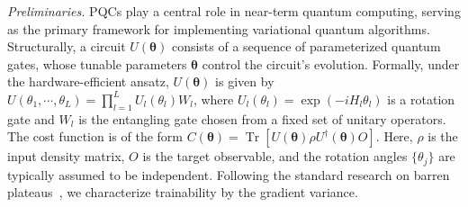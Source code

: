 \documentclass[%
 superscriptaddress,
 aps,prl,
 reprint,
 twocolumn,
 amsmath,amssymb,showpacs,
 bibnotes,
]{revtex4-2}
\begin{document}
\emph{\label{sec:2} Preliminaries.}
PQCs play a central role in near-term quantum computing, serving as the primary framework for implementing variational quantum algorithms. Structurally, a circuit $U(\boldsymbol{\theta})$ consists of a sequence of parameterized quantum gates, whose tunable parameters $\boldsymbol{\theta}$ control the circuit’s evolution. Formally, under the hardware-efficient ansatz, $U(\boldsymbol{\theta})$ is given by
    $U(\theta_1, \cdots, \theta_L) = \prod_{l=1}^LU_l(\theta_l)W_l$,
where  $U_l(\theta_l) = \exp(-iH_{l}\theta_{l})$ is a rotation gate and $W_l$ is the entangling gate chosen from a fixed set of unitary operators. The cost function is of the form $C(\boldsymbol{\theta}) = \operatorname{Tr}[U(\boldsymbol\theta)\rho U^\dagger(\boldsymbol\theta)O]$.
Here, $\rho$ is the input density matrix, $O$ is the target observable, and the rotation angles $\{\theta_j\}$ are typically assumed to be independent.
Following the standard research on barren plateaus~\cite{mcclean2018barren, holmes2022connecting}, we characterize trainability by the gradient variance.

\end{document}
